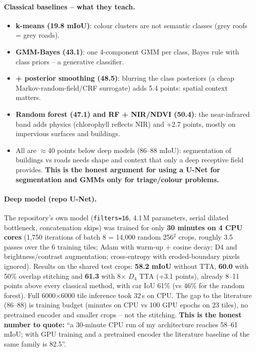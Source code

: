 \paragraph{Classical baselines -- what they teach.}
\begin{itemize}
\item \textbf{k-means (19.8 mIoU)}: colour clusters are not semantic classes (grey roofs = grey roads).
\item \textbf{GMM-Bayes (43.1)}: one 4-component GMM per class, Bayes rule with class priors -- a generative classifier.
\item \textbf{+ posterior smoothing (48.5)}: blurring the class posteriors (a cheap Markov-random-field/CRF surrogate)
adds 5.4 points: spatial context matters.
\item \textbf{Random forest (47.1) and RF + NIR/NDVI (50.4)}: the near-infrared band adds physics (chlorophyll
reflects NIR) and +2.7 points, mostly on impervious surfaces and buildings.
\item All are $\approx$40 points below deep models (86--88 mIoU): segmentation of buildings vs roads needs shape and
context that only a deep receptive field provides. \textbf{This is the honest argument for using a U-Net for
segmentation and GMMs only for triage/colour problems.}
\end{itemize}

\paragraph{Deep model (repo U-Net).} The repository's own model (\texttt{filters=16}, 4.1\,M parameters, serial dilated
bottleneck, concatenation skips) was trained for only \textbf{30 minutes on 4 CPU cores} (1{,}750 iterations of batch 8 =
14{,}000 random 256$^2$ crops, roughly 3.5 passes over the 6 training tiles; Adam with warm-up + cosine decay; D4 and brightness/contrast
augmentation; cross-entropy with eroded-boundary pixels ignored). Results on the shared test crops:
\textbf{58.2 mIoU} without TTA, \textbf{60.0} with 50\% overlap stitching and \textbf{61.3} with 8$\times$ $D_4$ TTA (+3.1 points),
already 8--11 points above every classical method, with car IoU 61\% (vs 46\% for the random forest). Full 6000$\times$6000 tile
inference took 32\,s on CPU. The gap to the literature (86--88) is training budget (minutes on CPU vs 100 GPU epochs on 23 tiles), no
pretrained encoder and smaller crops -- not the stitching. \textbf{This is the honest number to quote:} ``a 30-minute CPU run of my
architecture reaches 58--61 mIoU; with GPU training and a pretrained encoder the literature baseline of the same family is 82.5''.

